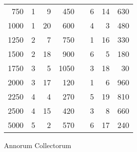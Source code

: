 \begin{tabnums}
\begin{tabular}[c]{@{} r rrr c rrr @{}}
 750 & 1 &  9 &  450 && 6 & 14 &  630 \\
1000 & 1 & 20 &  600 && 4 &  3 &  480 \\
1250 & 2 &  7 &  750 && 1 & 16 &  330 \\
1500 & 2 & 18 &  900 && 6 &  5 &  180 \\
1750 & 3 &  5 & 1050 && 3 & 18 &   30 \\
2000 & 3 & 17 &  120 && 1 &  6 &  960 \\
2250 & 4 &  4 &  270 && 5 & 19 &  810 \\
2500 & 4 & 15 &  420 && 3 &  8 &  660 \\
5000 & 5 &  2 &  570 && 6 & 17 &  240 \\
\bottomrule
\end{tabular}
\caption{Annorum Collectorum}
\label{tab:p193c}
\end{tabnums}
